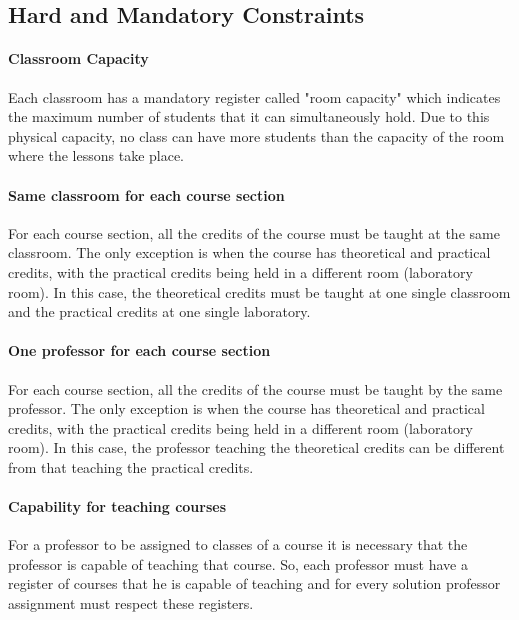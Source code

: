 \subsection{Hard and Mandatory Constraints}
\label{sec:mandatory}


\paragraph{Classroom Capacity}
\label{constrroomcap}

Each classroom has a mandatory register called "room capacity" which indicates the maximum number of students that it can simultaneously hold. Due to this physical capacity, no class can have more students than the capacity of the room where the lessons take place.


\paragraph{Same classroom for each course section}
\label{constroneroom}

For each course section, all the credits of the course must be taught at the same classroom. The only exception is when the course has theoretical and practical credits, with the practical credits being held in a different room (laboratory room). In this case, the theoretical credits must be taught at one single classroom and the practical credits at one single laboratory.


\paragraph{One professor for each course section}
\label{constroneprof}

For each course section, all the credits of the course must be taught by the same professor. The only exception is when the course has theoretical and practical credits, with the practical credits being held in a different room (laboratory room). In this case, the professor teaching the theoretical credits can be different from that teaching the practical credits.


\paragraph{Capability for teaching courses}
\label{constrcapab}

For a professor to be assigned to classes of a course it is necessary that the professor is capable of teaching that course. So, each professor must have a register of courses that he is capable of teaching and for every solution professor assignment must respect these registers.



